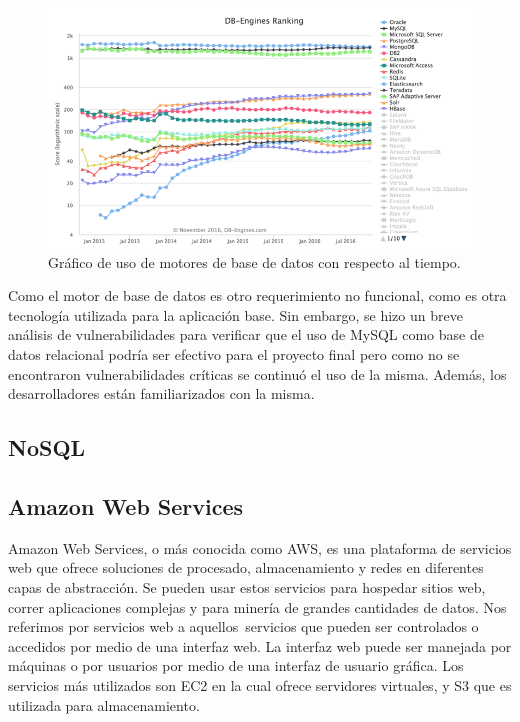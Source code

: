 \begin{figure}[H]
\centering
\includegraphics[width=125mm,scale=1]{Figuras/tecnologias/rank_db_2}
\caption{Gráfico de uso de motores de base de datos con respecto al tiempo.}
  \label{graph_db_2}
\end{figure}

Como el motor de base de datos es otro requerimiento no funcional, como es otra tecnología utilizada para la aplicación base. Sin embargo, se hizo un breve análisis de vulnerabilidades para verificar que el uso de MySQL como base de datos relacional podría ser efectivo para el proyecto final pero como no se encontraron vulnerabilidades críticas se continuó el uso de la misma. Además, los desarrolladores están familiarizados con la misma.

\subsection{NoSQL}

\subsection{Amazon Web Services}
Amazon Web Services, o más conocida como AWS, es una plataforma de servicios web que ofrece soluciones de procesado, almacenamiento y redes en diferentes capas de abstracción. Se pueden usar estos servicios para hospedar sitios web, correr aplicaciones complejas y para minería de grandes cantidades de datos\citep{wittig2015amazon}. Nos referimos por servicios web a aquellos\ servicios que pueden ser controlados o accedidos por medio de una interfaz web. La interfaz web puede ser manejada por máquinas o por usuarios por medio de una interfaz de usuario gráfica. Los servicios más utilizados son EC2 en la cual ofrece servidores virtuales, y S3 que es utilizada para almacenamiento.

